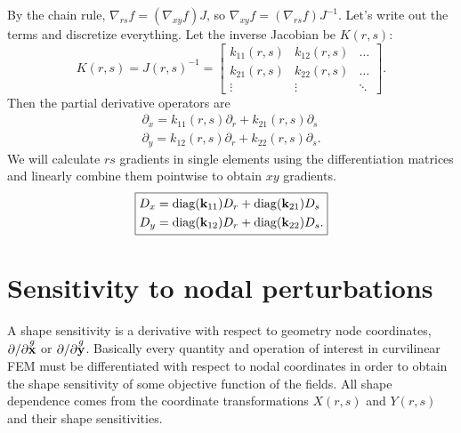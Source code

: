 By the chain rule, $\nabla_{rs} f = (\nabla_{xy}f)J$, so $\nabla_{xy}f = (\nabla_{rs} f) J^{-1}$.  Let's write out the terms and discretize everything.  Let the inverse Jacobian be $K(r,s)$:
%
\begin{equation}
K(r,s) = J(r,s)^{-1} = \begin{bmatrix}
k_{11}(r,s) & k_{12}(r,s) & \hdots \\
k_{21}(r,s) & k_{22}(r,s) & \hdots \\
\vdots & \vdots & \ddots
\end{bmatrix}.
\end{equation}
%
Then the partial derivative operators are
%
\begin{equation}
\begin{aligned}
\partial_x = k_{11}(r,s) \partial_r + k_{21}(r,s) \partial_s \\
\partial_y = k_{12}(r,s) \partial_r + k_{22}(r,s) \partial_s.
\end{aligned}
\end{equation}
%
We will calculate $rs$ gradients in single elements using the differentiation matrices and linearly combine them pointwise to obtain $xy$ gradients.
%
\begin{equation}
\boxed{
\begin{aligned}
D_x &= \mathrm{diag}(\textbf{k}_{11}) D_r + \mathrm{diag}(\textbf{k}_{21}) D_s \\
D_y &= \mathrm{diag}(\textbf{k}_{12}) D_r + \mathrm{diag}(\textbf{k}_{22}) D_s .
\end{aligned}
}
\end{equation}


\section{Sensitivity to nodal perturbations}

A shape sensitivity is a derivative with respect to geometry node coordinates, $\partial/\partial \overset{g}{\textbf{x}}$ or $\partial/\partial \overset{g}{\textbf{y}}$.  Basically every quantity and operation of interest in curvilinear FEM must be differentiated with respect to nodal coordinates in order to obtain the shape sensitivity of some objective function of the fields.  All shape dependence comes from the coordinate transformations $X(r,s)$ and $Y(r,s)$ and their shape sensitivities.

